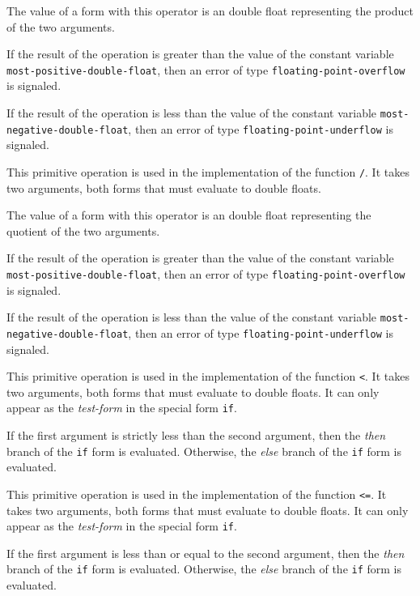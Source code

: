 The value of a form with this operator is an double float
representing the product of the two arguments.

If the result of the operation is greater than the value of the
constant variable \texttt{most-positive-double-float}, then an error of
type \texttt{floating-point-overflow} is signaled.

If the result of the operation is less than the value of the constant
variable \texttt{most-negative-double-float}, then an error of type
\texttt{floating-point-underflow} is signaled.

 {}

This primitive operation is used in the implementation of the
\commonlisp{} function \texttt{/}.  It takes two arguments, both forms
that must evaluate to double floats.

The value of a form with this operator is an double float
representing the quotient of the two arguments.

If the result of the operation is greater than the value of the
constant variable \texttt{most-positive-double-float}, then an error of
type \texttt{floating-point-overflow} is signaled.

If the result of the operation is less than the value of the constant
variable \texttt{most-negative-double-float}, then an error of type
\texttt{floating-point-underflow} is signaled.

 {}

This primitive operation is used in the implementation of the
\commonlisp{} function \texttt{<}.  It takes two arguments, both forms
that must evaluate to double floats.  It can only appear as the
\emph{test-form} in the special form \texttt{if}.

If the first argument is strictly less than the second argument, then
the \emph{then} branch of the \texttt{if} form is evaluated.
Otherwise, the \emph{else} branch of the \texttt{if} form is
evaluated.

 {}

This primitive operation is used in the implementation of the
\commonlisp{} function \texttt{<=}.  It takes two arguments, both forms
that must evaluate to double floats.  It can only appear as the
\emph{test-form} in the special form \texttt{if}.

If the first argument is less than or equal to the second argument,
then the \emph{then} branch of the \texttt{if} form is evaluated.
Otherwise, the \emph{else} branch of the \texttt{if} form is
evaluated.


